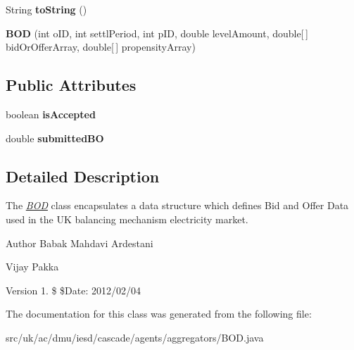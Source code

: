 \begin{DoxyCompactItemize}
\item 
\hypertarget{classuk_1_1ac_1_1dmu_1_1iesd_1_1cascade_1_1agents_1_1aggregators_1_1_b_o_d_a88f0fc923286ed7259ecaf7bc4c691c7}{String {\bfseries to\-String} ()}\label{classuk_1_1ac_1_1dmu_1_1iesd_1_1cascade_1_1agents_1_1aggregators_1_1_b_o_d_a88f0fc923286ed7259ecaf7bc4c691c7}

\item 
\hypertarget{classuk_1_1ac_1_1dmu_1_1iesd_1_1cascade_1_1agents_1_1aggregators_1_1_b_o_d_a04b04521d07d22149a5e29abc882ab14}{{\bfseries B\-O\-D} (int o\-I\-D, int settl\-Period, int p\-I\-D, double level\-Amount, double\mbox{[}$\,$\mbox{]} bid\-Or\-Offer\-Array, double\mbox{[}$\,$\mbox{]} propensity\-Array)}\label{classuk_1_1ac_1_1dmu_1_1iesd_1_1cascade_1_1agents_1_1aggregators_1_1_b_o_d_a04b04521d07d22149a5e29abc882ab14}

\end{DoxyCompactItemize}
\subsection*{Public Attributes}
\begin{DoxyCompactItemize}
\item 
\hypertarget{classuk_1_1ac_1_1dmu_1_1iesd_1_1cascade_1_1agents_1_1aggregators_1_1_b_o_d_a3b75e7a37019238fb7801b4f12437a22}{boolean {\bfseries is\-Accepted}}\label{classuk_1_1ac_1_1dmu_1_1iesd_1_1cascade_1_1agents_1_1aggregators_1_1_b_o_d_a3b75e7a37019238fb7801b4f12437a22}

\item 
\hypertarget{classuk_1_1ac_1_1dmu_1_1iesd_1_1cascade_1_1agents_1_1aggregators_1_1_b_o_d_afc4137bcc84d541ddd0f8c5a75072798}{double {\bfseries submitted\-B\-O}}\label{classuk_1_1ac_1_1dmu_1_1iesd_1_1cascade_1_1agents_1_1aggregators_1_1_b_o_d_afc4137bcc84d541ddd0f8c5a75072798}

\end{DoxyCompactItemize}


\subsection{Detailed Description}
The {\itshape \hyperlink{classuk_1_1ac_1_1dmu_1_1iesd_1_1cascade_1_1agents_1_1aggregators_1_1_b_o_d}{B\-O\-D}} class encapsulates a data structure which defines Bid and Offer Data used in the U\-K balancing mechanism electricity market. 

\begin{DoxyAuthor}{Author}
Babak Mahdavi Ardestani 

Vijay Pakka 
\end{DoxyAuthor}
\begin{DoxyVersion}{Version}
1. \$ \$\-Date\-: 2012/02/04 
\end{DoxyVersion}


The documentation for this class was generated from the following file\-:\begin{DoxyCompactItemize}
\item 
src/uk/ac/dmu/iesd/cascade/agents/aggregators/B\-O\-D.\-java\end{DoxyCompactItemize}
